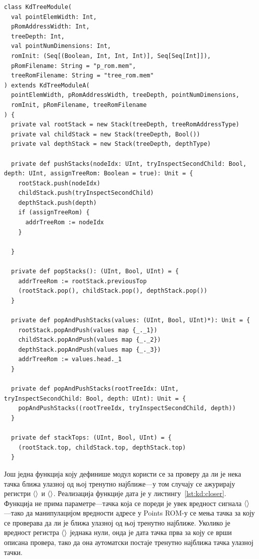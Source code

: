\documentclass[master]{finthesis}
\newcommand*{\correctmath}[1]{%
    \ifcsname mathCorrectionFor#1\endcsname%
        \csname mathCorrectionFor#1\endcsname%
    \else%
        #1%
    \fi%
}
\newcommand*{\mfield}[1]{{\langle\correctmath{#1}\/\rangle}}
\newcommand*{\field}[1]{\texorpdfstring{$\mfield{#1}$}{⟨#1⟩}}
\newcommand*{\prog}[1]{\texttt{#1}}
\begin{document}
\begin{lstlisting}[style=Chisel, caption={Декларација модула \prog{KdTreeModule}.}, label={lst:kd:decl}]
class KdTreeModule(
  val pointElemWidth: Int,
  pRomAddressWidth: Int,
  treeDepth: Int,
  val pointNumDimensions: Int,
  romInit: (Seq[(Boolean, Int, Int, Int)], Seq[Seq[Int]]),
  pRomFilename: String = "p_rom.mem",
  treeRomFilename: String = "tree_rom.mem"
) extends KdTreeModuleA(
  pointElemWidth, pRomAddressWidth, treeDepth, pointNumDimensions,
  romInit, pRomFilename, treeRomFilename
) {
  private val rootStack = new Stack(treeDepth, treeRomAddressType)
  private val childStack = new Stack(treeDepth, Bool())
  private val depthStack = new Stack(treeDepth, depthType)

  private def pushStacks(nodeIdx: UInt, tryInspectSecondChild: Bool, depth: UInt, assignTreeRom: Boolean = true): Unit = {
    rootStack.push(nodeIdx)
    childStack.push(tryInspectSecondChild)
    depthStack.push(depth)
    if (assignTreeRom) {
      addrTreeRom := nodeIdx
    }

  }

  private def popStacks(): (UInt, Bool, UInt) = {
    addrTreeRom := rootStack.previousTop
    (rootStack.pop(), childStack.pop(), depthStack.pop())
  }

  private def popAndPushStacks(values: (UInt, Bool, UInt)*): Unit = {
    rootStack.popAndPush(values map {_._1})
    childStack.popAndPush(values map {_._2})
    depthStack.popAndPush(values map {_._3})
    addrTreeRom := values.head._1
  }

  private def popAndPushStacks(rootTreeIdx: UInt, tryInspectSecondChild: Bool, depth: UInt): Unit = {
    popAndPushStacks((rootTreeIdx, tryInspectSecondChild, depth))
  }

  private def stackTops: (UInt, Bool, UInt) = {
    (rootStack.top, childStack.top, depthStack.top)
  }
\end{lstlisting}

Још једна функција коју дефинише модул користи се за проверу да ли је нека тачка ближа улазној од њој тренутно најближе---у том случају се ажурирају регистри \field{closestPoint} и \field{closestPointDist}. Реализација функције дата је у листингу~\ref{lst:kd:closer}. Функција не прима параметре---тачка која се пореди је увек вредност сигнала \field{outPRom}---тако да манипулацијом вредности адресе у Points ROM-у се мења тачка за коју се проверава да ли је ближа улазној од њој тренутно најближе. Уколико је вредност регистра \field{closestPointAssigned} једнака нули, онда је дата тачка прва за коју се врши описана провера, тако да она аутоматски постаје тренутно најближа тачка улазној тачки.
\end{document}
